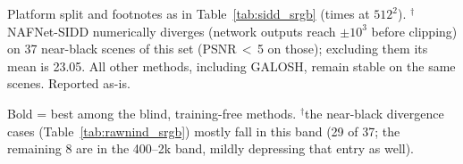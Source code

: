 \begin{table}[t]
\vspace{2pt}
{\footnotesize Platform split and footnotes as in Table~\ref{tab:sidd_srgb}
(times at $512^2$). $^{\dagger}$NAFNet-SIDD numerically diverges (network
outputs reach $\pm10^3$ before clipping) on 37 near-black scenes of this set
(PSNR\,$<$\,5 on those);
excluding them its mean is 23.05. All other methods, including GALOSH, remain
stable on the same scenes. Reported as-is.}
\end{table}

\begin{table}[t]
\centering
\caption{RawNIND sRGB \textbf{per-ISO} mean PSNR (dB). At low ISO the scenes
are already near-clean and no method can gain much; at high ISO --- where
denoising matters --- GALOSH clearly outperforms the classical baselines while
the trained DL are moderately ahead of GALOSH. We report this breakdown because
the aggregate of Table~\ref{tab:rawnind_srgb} hides both effects.}
\label{tab:rawnind_srgb_iso}
\setlength{\tabcolsep}{5pt}

\vspace{2pt}
{\footnotesize Bold = best among the blind, training-free methods.
$^{\dagger}$the near-black divergence cases (Table~\ref{tab:rawnind_srgb})
mostly fall in this band (29 of 37; the remaining 8 are in the 400--2k band,
mildly depressing that entry as well).}
\end{table}
